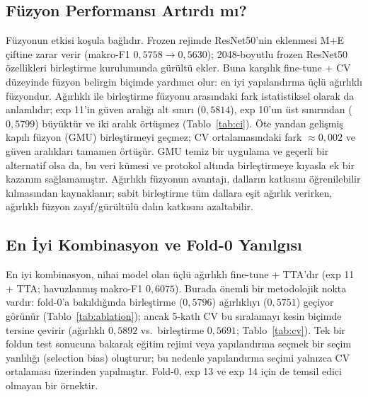 \subsection{Füzyon Performansı Artırdı mı?}
\label{subsec:disc-fusion}
Füzyonun etkisi koşula bağlıdır. Frozen rejimde
ResNet50'nin eklenmesi M+E çiftine zarar verir (makro-F1 $0{,}5758
\rightarrow 0{,}5630$); 2048-boyutlu frozen ResNet50 özellikleri birleştirme
kurulumunda gürültü ekler. Buna karşılık fine-tune + CV düzeyinde füzyon belirgin
biçimde yardımcı olur: en iyi yapılandırma üçlü ağırlıklı füzyondur. Ağırlıklı ile
birleştirme füzyonu arasındaki fark istatistiksel olarak da anlamlıdır; exp 11'in
güven aralığı alt sınırı ($0{,}5814$), exp 10'un üst sınırından ($0{,}5799$)
büyüktür ve iki aralık örtüşmez (Tablo~\ref{tab:ci}). Öte yandan gelişmiş kapılı
füzyon (GMU) birleştirmeyi geçmez; CV ortalamasındaki fark $\approx 0{,}002$ ve
güven aralıkları tamamen örtüşür. GMU temiz bir uygulama ve geçerli bir
alternatif olsa da, bu veri kümesi ve protokol altında birleştirmeye kıyasla ek
bir kazanım sağlamamıştır. Ağırlıklı füzyonun avantajı, dalların
katkısını öğrenilebilir kılmasından kaynaklanır; sabit birleştirme tüm dallara
eşit ağırlık verirken, ağırlıklı füzyon zayıf/gürültülü dalın katkısını
azaltabilir.

\subsection{En İyi Kombinasyon ve Fold-0 Yanılgısı}
\label{subsec:disc-best}
En iyi kombinasyon, nihai model olan üçlü ağırlıklı fine-tune + TTA'dır
(exp 11 + TTA; havuzlanmış makro-F1 $0{,}6075$). Burada önemli bir metodolojik
nokta vardır: fold-0'a bakıldığında birleştirme ($0{,}5796$) ağırlıklıyı
($0{,}5751$) geçiyor görünür (Tablo~\ref{tab:ablation}); ancak 5-katlı CV bu
sıralamayı kesin biçimde tersine çevirir (ağırlıklı $0{,}5892$ vs.\ birleştirme
$0{,}5691$; Tablo~\ref{tab:cv}). Tek bir foldun test sonucuna bakarak eğitim
rejimi veya yapılandırma seçmek bir seçim yanlılığı (selection bias) oluşturur;
bu nedenle yapılandırma seçimi yalnızca CV ortalaması üzerinden yapılmıştır.
Fold-0, exp 13 ve exp 14 için de temsil edici olmayan bir örnektir.

